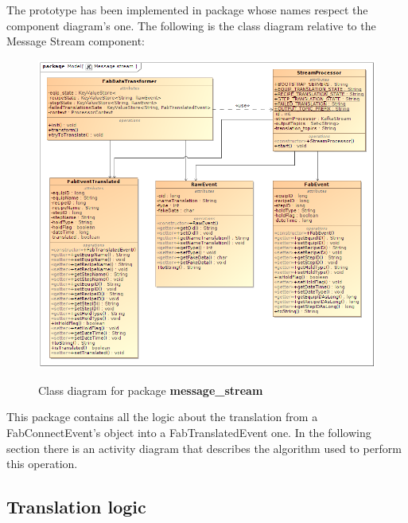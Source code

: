 The prototype has been implemented in package whose names respect the component diagram's one. The following is the class diagram relative to the Message Stream component:

 \begin{figure}[H]
\centering
\includegraphics[width=\textwidth]{img/Class_Diagram.png} \\
\caption{Class diagram for package \textbf{message\_stream}}
\end{figure}

This package contains all the logic about the translation from a FabConnectEvent's object into a FabTranslatedEvent one. In the following section there is an activity diagram that describes the algorithm used to perform this operation.

\subsection{Translation logic}
\newpage

